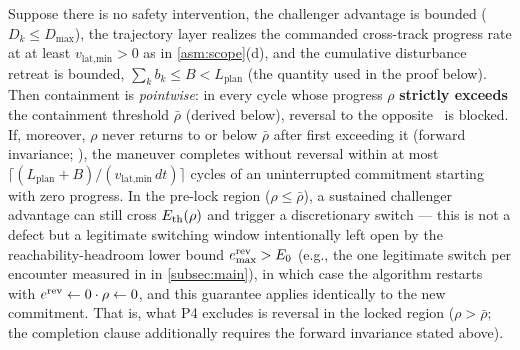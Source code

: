 \begin{proposition} \label{prop:p4}
Suppose there is no safety intervention, the challenger advantage is bounded ($D_k \le D_{\max}$), the trajectory layer realizes the commanded cross-track progress rate at at least $v_{\text{lat,min}} > 0$ as in \cref{asm:scope}(d), and the cumulative disturbance retreat is bounded, $\sum_k b_k \le B < L_{\text{plan}}$ (the quantity used in the proof below). Then containment is \emph{pointwise}: in every cycle whose progress $\rho$ \textbf{strictly exceeds} the containment threshold $\bar\rho$ (derived below), reversal to the opposite \Class\ is blocked. If, moreover, $\rho$ never returns to or below $\bar\rho$ after first exceeding it (forward invariance; ), the maneuver completes without reversal within at most $\lceil(L_{\text{plan}}+B)/(v_{\text{lat,min}}\, dt)\rceil$ cycles of an uninterrupted commitment starting with zero progress. In the pre-lock region ($\rho \le \bar\rho$), a sustained challenger advantage can still cross $E_{\text{th}}(\rho)$ and trigger a discretionary switch --- this is not a defect but a legitimate switching window intentionally left open by the reachability-headroom lower bound $e^{\text{rev}}_{\max} > E_0$ (e.g., the one legitimate switch per encounter measured in  in \cref{subsec:main}), in which case the algorithm restarts with $e^{\text{rev}} \leftarrow 0 \cdot \rho \leftarrow 0$, and this guarantee applies identically to the new commitment. That is, what P4 excludes is reversal in the locked region ($\rho > \bar\rho$; the completion clause additionally requires the forward invariance stated above).
\end{proposition}


